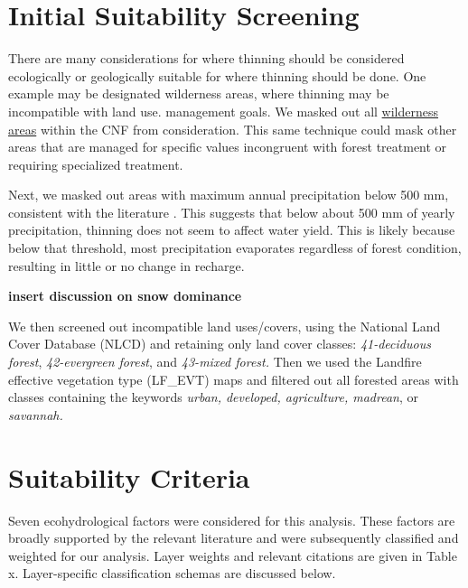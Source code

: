 \documentclass[
  number,
  preprint,
  3p,
  onecolumn]{elsarticle}
\begin{document}
\section{Initial Suitability
Screening}\label{initial-suitability-screening}

There are many considerations for where thinning should be considered
ecologically or geologically suitable for where thinning should be done.
One example may be designated wilderness areas, where thinning may be
incompatible with land use. management goals. We masked out all
\href{https://gis1.usgs.gov/arcgis/rest/services/padus3/Fee_Managers/MapServer}{wilderness
areas} within the CNF from consideration. This same technique could mask
other areas that are managed for specific values incongruent with forest
treatment or requiring specialized treatment.

Next, we masked out areas with maximum annual precipitation below 500
mm, consistent with the literature
\citep{bosch1982, hibbert1979b, adams2012a, biederman2022a}. This
suggests that below about 500 mm of yearly precipitation, thinning does
not seem to affect water yield. This is likely because below that
threshold, most precipitation evaporates regardless of forest condition,
resulting in little or no change in recharge.

\textbf{insert discussion on snow dominance}

We then screened out incompatible land uses/covers, using the National
Land Cover Database (NLCD) and retaining only land cover classes:
\emph{41-deciduous forest}, \emph{42-evergreen forest}, and
\emph{43-mixed forest.} Then we used the Landfire effective vegetation
type (LF\_EVT) maps and filtered out all forested areas with classes
containing the keywords \emph{urban, developed, agriculture, madrean},
or \emph{savannah.}

\section{Suitability Criteria}\label{suitability-criteria}

Seven ecohydrological factors were considered for this analysis. These
factors are broadly supported by the relevant literature and were
subsequently classified and weighted for our analysis. Layer weights and
relevant citations are given in Table x. Layer-specific classification
schemas are discussed below.
\end{document}
